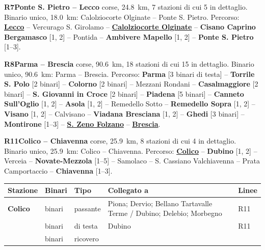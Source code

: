 \medskip\noindent\hypertarget{lin:R7}{\textbf{R7\enspace Ponte S. Pietro -- Lecco}} corse, \SI{24,8}{\km}, 7 stazioni di cui 5 in dettaglio. Binario unico, \SI{18,0}{\km}: Calolziocorte Olginate -- Ponte S. Pietro. Percorso: \hyperlink{sta:S01520}{\textbf{Lecco}} -- Vercurago S. Girolamo -- \hyperlink{sta:S01524}{\textbf{Calolziocorte Olginate}} -- \hypertarget{sta:S01525}{\textbf{Cisano Caprino Bergamasco}} [1, 2] -- Pontida -- \hypertarget{sta:S01527}{\textbf{Ambivere Mapello}} [1, 2] -- \hypertarget{sta:S01528}{\textbf{Ponte S. Pietro}} [1--3].

\medskip\noindent\hypertarget{lin:R8}{\textbf{R8\enspace Parma -- Brescia}} corse, \SI{90,6}{\km}, 18 stazioni di cui 15 in dettaglio. Binario unico, \SI{90,6}{\km}: Parma -- Brescia. Percorso: \hypertarget{sta:S05014}{\textbf{Parma}} [3 binari di testa] -- \hypertarget{sta:S01853}{\textbf{Torrile S. Polo}} [2 binari] -- \hypertarget{sta:S01852}{\textbf{Colorno}} [2 binari] -- Mezzani Rondani -- \hypertarget{sta:S01850}{\textbf{Casalmaggiore}} [2 binari] -- \hypertarget{sta:S01849}{\textbf{S. Giovanni in Croce}} [2 binari] -- \hypertarget{sta:S01919}{\textbf{Piadena}} [5 binari] -- \hypertarget{sta:S01848}{\textbf{Canneto Sull'Oglio}} [1, 2] -- \hypertarget{sta:S01847}{\textbf{Asola}} [1, 2] -- Remedello Sotto -- \hypertarget{sta:S01845}{\textbf{Remedello Sopra}} [1, 2] -- \hypertarget{sta:S01844}{\textbf{Visano}} [1, 2] -- Calvisano -- \hypertarget{sta:S01842}{\textbf{Viadana Bresciana}} [1, 2] -- \hypertarget{sta:S01841}{\textbf{Ghedi}} [3 binari] -- \hypertarget{sta:S01840}{\textbf{Montirone}} [1--3] -- \hyperlink{sta:S01900}{\textbf{S. Zeno Folzano}} -- \hyperlink{sta:S09999}{\textbf{Brescia}}.

\medskip\noindent\hypertarget{lin:R11}{\textbf{R11\enspace Colico -- Chiavenna}} corse, \SI{25,9}{\km}, 8 stazioni di cui 4 in dettaglio. Binario unico, \SI{25,9}{\km}: Colico -- Chiavenna. Percorso: \hyperlink{sta:S01420}{\textbf{Colico}} -- \hypertarget{sta:S01405}{\textbf{Dubino}} [1, 2] -- Verceia -- \hypertarget{sta:S01403}{\textbf{Novate-Mezzola}} [1--5] -- Samolaco -- S. Cassiano Valchiavenna -- Prata Camportaccio -- \hypertarget{sta:S01400}{\textbf{Chiavenna}} [1--3].
{\footnotesize\setlength{\LTpre}{2pt}\setlength{\LTpost}{0pt}
\begin{longtable}{@{}>{\raggedright\arraybackslash}p{}>{\raggedright\arraybackslash}p{}>{\raggedright\arraybackslash}p{}>{\raggedright\arraybackslash}p{}>{\raggedright\arraybackslash}p{}@{}}
\toprule
Stazione & Binari & Tipo & Collegato a & Linee \\
\midrule
\endhead
\leavevmode\hypertarget{sta:S01420}{}\textbf{Colico} & 3 binari & passante & Piona; Dervio; Bellano Tartavalle Terme / Dubino; Delebio; Morbegno & R11 \\
 & 2 binari & di testa & Dubino & R11 \\
 & 10 binari & ricovero & & \\
\bottomrule
\end{longtable}}

